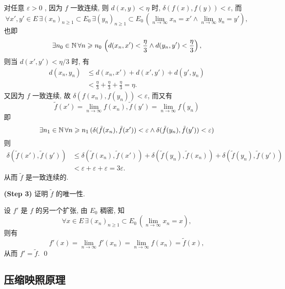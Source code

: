 \begin{Proof}
        对任意 $ \varepsilon>0 $ , 因为 $ f $ 一致连续, 则 $ d(x, y)<\eta $ 时, $ \delta(f(x), f(y))<\varepsilon $, 而
        \[
            \forall x', y'\in E\,\exists  (x_{n})_{n\geqslant1}\subset E_{0} \,\exists  (y_{n})_{n\geqslant1}\subset E_{0} \,(\lim_{n\to\infty}x_{n}=x'\land \lim_{n\to\infty}y_{n}=y' ),
        \]
        也即
        \[
            \exists n_{0}\in\mathbb{N}\,\forall n\geqslant n_{0}\,\left(d(x_{n}, x')<\frac{\eta}{3}\land d(y_{n}, y')<\frac{\eta}{3}\right),
        \]
        则当 $ d(x', y')<\eta/3 $ 时, 有
        \[
            \begin{aligned}
                d(x_{n}, y_{n}) & \leqslant d(x_{n}, x')+d(x', y')+d(y', y_{n})\\
                & < \frac{\eta}{3}+\frac{\eta}{3}+\frac{\eta}{3}=\eta.
            \end{aligned}
        \]
        又因为 $ f $ 一致连续, 故 $ \delta(f(x_{n}), f(y_{n}))<\varepsilon $, 而又有
        \[
            \tilde{f}(x')=\lim_{n\to\infty}f(x_{n}), \tilde{f}(y')=\lim_{n\to\infty}f(y_{n})
        \]
        即
        \[
            \exists n_{1}\in\mathbb{N}\,\forall n\geqslant n_{1}\,(\delta(\tilde{f}(x_{n}), \tilde{f}(x'))<\varepsilon\land \delta(\tilde{f}(y_{n}), \tilde{f}(y'))<\varepsilon)
        \]
        则
        \[
            \begin{aligned}
                \delta(\tilde{f}(x'), \tilde{f}(y')) & \leqslant \delta(\tilde{f}(x_{n}), \tilde{f}(x'))+\delta(\tilde{f}(y_{n}), \tilde{f}(x_{n}))+\delta(\tilde{f}(y_{n}), \tilde{f}(y'))\\
                & <\varepsilon+\varepsilon+\varepsilon=3\varepsilon.
            \end{aligned}
        \]
        从而 $ \tilde{f} $ 是一致连续的.

        \textbf{(Step 3)} 证明 $ \tilde{f} $ 的唯一性.


        设 $ {f}' $ 是 $ f $ 的另一个扩张, 由 $ E_{0} $ 稠密, 知
        \[
            \forall x\in E\,\exists (x_{n})_{n\geqslant1} \subset E_{0}\,(\lim_{n\to\infty}x_{n}=x),
        \]
        则有
        \[
            f'(x)=\lim_{n\to\infty}f'(x_{n})=\lim_{n\to\infty}f(x_{n})=\tilde{f}(x),
        \]
        从而 $ f'=\tilde{f} $. \qed
    \end{Proof}

    \subsection{压缩映照原理}

